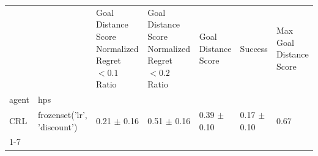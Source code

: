 \begin{tabular}{lllllll}
\toprule
 &  & Goal Distance Score Normalized Regret $< 0.1$ Ratio & Goal Distance Score Normalized Regret $< 0.2$ Ratio & Goal Distance Score & Success & Max Goal Distance Score \\
agent & hps &  &  &  &  &  \\
\midrule
CRL & frozenset({'lr', 'discount'}) & 0.21 $\pm$ 0.16 & 0.51 $\pm$ 0.16 & 0.39 $\pm$ 0.10 & 0.17 $\pm$ 0.10 & 0.67 \\
\cline{1-7}
\bottomrule
\end{tabular}
